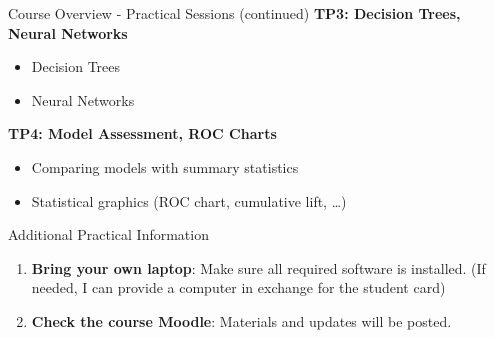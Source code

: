 \begin{frame}{Course Overview - Practical Sessions (continued)}
\textbf{TP3: Decision Trees, Neural Networks}
\begin{itemize}
    \item Decision Trees
    \item Neural Networks
\end{itemize}

\textbf{TP4: Model Assessment, ROC Charts}
\begin{itemize}
    \item Comparing models with summary statistics
    \item Statistical graphics (ROC chart, cumulative lift, \dots)
\end{itemize}
\end{frame}




\begin{frame}[fragile]{Additional Practical Information}
\begin{enumerate}
  \item \textbf{Bring your own laptop}: Make sure all required software is installed. (If needed, I can provide a computer in exchange for the student card)
  \item \textbf{Check the course Moodle}: Materials and updates will be posted.
\end{enumerate}
\end{frame}
